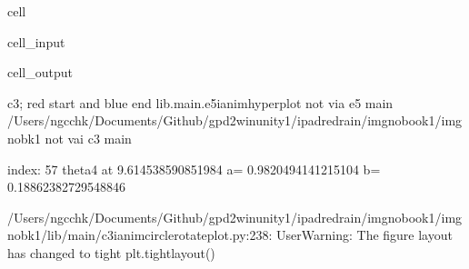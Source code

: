 \documentclass[letterpaper,10pt,english]{jupyterBook}
\begin{document}
\begin{sphinxuseclass}{cell}\begin{sphinxVerbatimInput}

\begin{sphinxuseclass}{cell_input}
\begin{sphinxVerbatim}[commandchars=\\\{\}]
 
 
   
\end{sphinxVerbatim}

\end{sphinxuseclass}\end{sphinxVerbatimInput}
\begin{sphinxVerbatimOutput}

\begin{sphinxuseclass}{cell_output}
\begin{sphinxVerbatim}[commandchars=\\\{\}]
c3; red start and blue end
lib.main.e5\PYGZus{}i\PYGZus{}anim\PYGZus{}hyperplot
not via e5 main
/Users/ngcchk/Documents/Github/gpd2\PYGZhy{}win\PYGZhy{}unity1/ipadred\PYGZhy{}rain/imgno\PYGZus{}book1/imgnobk1
not vai c3 main

index: 57 
theta4 at  9.614538590851984 
 a= \PYGZhy{}0.9820494141215104  b= \PYGZhy{}0.18862382729548846 
\end{sphinxVerbatim}

\begin{sphinxVerbatim}[commandchars=\\\{\}]
/Users/ngcchk/Documents/Github/gpd2\PYGZhy{}win\PYGZhy{}unity1/ipadred\PYGZhy{}rain/imgno\PYGZus{}book1/imgnobk1/lib/main/c3\PYGZus{}i\PYGZus{}anim\PYGZus{}circle\PYGZus{}rotate\PYGZus{}plot.py:238: UserWarning: The figure layout has changed to tight
  plt.tight\PYGZus{}layout()
\end{sphinxVerbatim}

\noindent{}

\end{sphinxuseclass}\end{sphinxVerbatimOutput}

\end{sphinxuseclass}
\end{document}

